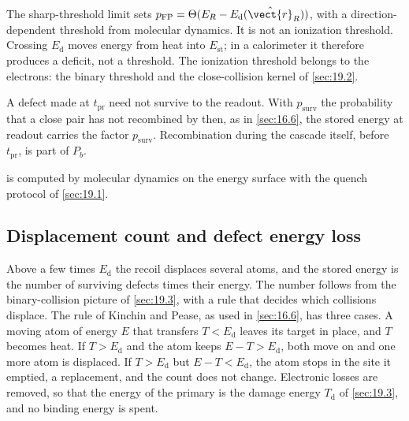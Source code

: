 The sharp-threshold limit sets $p_{\mathrm{FP}} = \Theta(E_R - E_{\mathrm{d}}(\hat{\vect{r}}_R))$, with a direction-dependent threshold from molecular dynamics. It is not an ionization threshold. Crossing $E_{\mathrm{d}}$ moves energy from heat into $E_{\mathrm{st}}$; in a calorimeter it therefore produces a deficit, not a threshold. The ionization threshold belongs to the electrons: the binary threshold and the close-collision kernel of \cref{sec:19.2}.

A defect made at $t_{\mathrm{pr}}$ need not survive to the readout. With $p_{\mathrm{surv}}$ the probability that a close pair has not recombined by then, as in \cref{sec:16.6}, the stored energy at readout carries the factor $p_{\mathrm{surv}}$. Recombination during the cascade itself, before $t_{\mathrm{pr}}$, is part of $P_b$.

 is computed by molecular dynamics on the energy surface with the quench protocol of \cref{sec:19.1}.

\subsection{Displacement count and defect energy loss}\label{sec:19.4-count}

Above a few times $E_{\mathrm{d}}$ the recoil displaces several atoms, and the stored energy is the number of surviving defects times their energy. The number follows from the binary-collision picture of \cref{sec:19.3}, with a rule that decides which collisions displace. The rule of Kinchin and Pease, as used in \cref{sec:16.6}, has three cases. A moving atom of energy $E$ that transfers $T < E_{\mathrm{d}}$ leaves its target in place, and $T$ becomes heat. If $T > E_{\mathrm{d}}$ and the atom keeps $E - T > E_{\mathrm{d}}$, both move on and one more atom is displaced. If $T > E_{\mathrm{d}}$ but $E - T < E_{\mathrm{d}}$, the atom stops in the site it emptied, a replacement, and the count does not change. Electronic losses are removed, so that the energy of the primary is the damage energy $T_{\mathrm{d}}$ of \cref{sec:19.3}, and no binding energy is spent.

